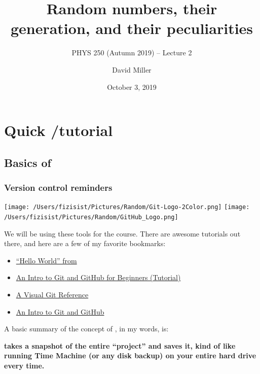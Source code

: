 \documentclass[hyperref={colorlinks=true}]{beamer}
\title[PHYS 250 (Autumn 2019) TODAY -- Lecture 1]{Random numbers, their generation, and their peculiarities}
\subtitle{PHYS 250 (Autumn 2019) -- Lecture 2}
\author[D.W.~Miller]{David Miller}
\institute[EFI, Chicago] 
{
  Department of Physics and the Enrico Fermi Institute\\
  University of Chicago
}
\date[October 3, 2019]{October 3, 2019}
\begin{document}

{
\begin{frame}
  \titlepage
\end{frame}
}

\section[Quick \git/\github tutorial]{Quick \git/\github tutorial}

\subsection[Basics of \git]{Basics of \git}

\begin{frame}%
  \frametitle{Version control reminders}
  
  \begin{center}
    \texttt{[image: /Users/fizisist/Pictures/Random/Git-Logo-2Color.png]}
    \texttt{[image: /Users/fizisist/Pictures/Random/GitHub\_Logo.png]}
  \end{center}

  We will be using these tools for the course. There are  awesome tutorials out there, and here are a few of my favorite bookmarks:
  
  \begin{itemize}
    \item \href{https://guides.github.com/activities/hello-world/}{``Hello World'' from \github}
    \item \href{https://product.hubspot.com/blog/git-and-github-tutorial-for-beginners}{An Intro to Git and GitHub for Beginners (Tutorial)}
    \item \href{http://marklodato.github.io/visual-git-guide/index-en.html}{A Visual Git Reference}
    \item \href{https://medium.com/@abhishekj/an-intro-to-git-and-github-1a0e2c7e3a2f}{An Intro to Git and GitHub}
  \end{itemize}

  A basic summary of the concept of \git, in my words, is:
  
  \begin{ucblock}{}
    \centering \textbf{\git takes a snapshot of the entire ``project'' and saves it, kind of like running Time Machine (or any disk backup) on your entire hard drive every time.}
  \end{ucblock}


\end{frame}
\end{document}
